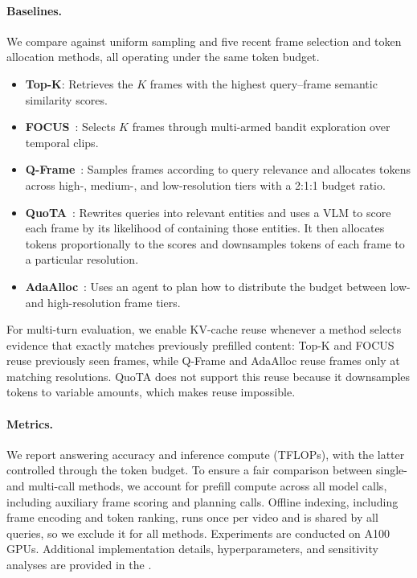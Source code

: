 \paragraph{Baselines.}
We compare \name against uniform sampling and five recent frame selection and token allocation methods, all operating under the same token budget. 
\begin{itemize}\setlength{\itemsep}{0pt}\setlength{\parskip}{0pt}\setlength{\topsep}{2pt}
\item \textbf{Top-K}: Retrieves the $K$ frames with the highest query--frame semantic similarity scores.

\item \textbf{FOCUS}~\cite{zhu2026focus}: Selects $K$ frames through multi-armed bandit exploration over temporal clips.

\item \textbf{Q-Frame}~\cite{zhang2025qframe}: Samples frames according to query relevance and allocates tokens across high-, medium-, and low-resolution tiers with a 2:1:1 budget ratio.

\item \textbf{QuoTA}~\cite{luo2025quota}: Rewrites queries into relevant entities and uses a VLM to score each frame by its likelihood of containing those entities. It then allocates tokens proportionally to the scores and downsamples tokens of each frame to a particular resolution.

\item \textbf{AdaAlloc}~\cite{an2026adaalloc}: Uses an agent to plan how to distribute the budget between low- and high-resolution frame tiers.
\end{itemize}
For multi-turn evaluation, we enable KV-cache reuse whenever a method selects evidence that exactly matches previously prefilled content: Top-K and FOCUS reuse previously seen frames, while Q-Frame and AdaAlloc reuse frames only at matching resolutions. QuoTA does not support this reuse because it downsamples tokens to variable amounts, which makes reuse impossible.


\paragraph{Metrics.}
We report answering accuracy and inference compute (TFLOPs), with the latter controlled through the token budget. To ensure a fair comparison between single- and multi-call methods, we account for prefill compute across all model calls, including auxiliary frame scoring and planning calls. Offline indexing, including frame encoding and token ranking, runs once per video and is shared by all queries, so we exclude it for all methods. Experiments are conducted on A100 GPUs. Additional implementation details, hyperparameters, and sensitivity analyses are provided in the \suppmaterial.


